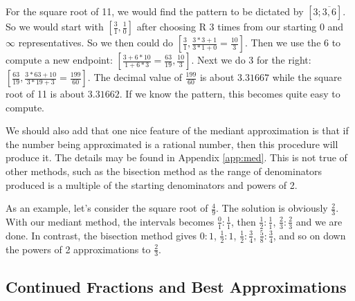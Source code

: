 \documentclass[12pt]{article}
\begin{document}
For the square root of 11, we would find the pattern to be dictated by $[3;\overline{3,6}]$. So we would start with $[\tfrac{3}{1}, \tfrac{1}{0}]$ after choosing R 3 times from our starting 0 and $\infty$ representatives. So we then could do $[\tfrac{3}{1}, \tfrac{3*3 + 1}{3*1 + 0} = \tfrac{10}{3}]$. Then we use the 6 to compute a new endpoint:  $[\tfrac{3+6*10}{1+6*3} = \tfrac{63}{19}, \tfrac{10}{3}]$. Next we do 3 for the right:  $[\tfrac{63}{19}, \tfrac{3*63+10}{3*19+3} = \tfrac{199}{60}]$. The decimal value of $\tfrac{199}{60}$ is about $3.31667$ while the square root of 11 is about $3.31662$. If we know the pattern, this becomes quite easy to compute. 

We should also add that one nice feature of the mediant approximation is that if the number being approximated is a rational number, then this procedure will produce it. The details may be found in Appendix \ref{app:med}. This is not true of other methods, such as the bisection method as the range of denominators produced is a multiple of the starting denominators and powers of 2. 

As an example, let's consider the square root of $\frac{4}{9}$. The solution is obviously $\frac{2}{3}$. With our mediant method, the intervals becomes $\frac{0}{1}:\frac{1}{1}$, then $\frac{1}{2}:\frac{1}{1}$, $\frac{2}{3}:\frac{2}{3}$ and we are done. In contrast, the bisection method gives $0:1$, $\frac{1}{2}:1$, $\frac{1}{2}:\frac{3}{4}$, $\frac{5}{8}:\frac{3}{4}$, and so on down the powers of 2 approximations to $\frac{2}{3}$. 

\subsection{Continued Fractions and Best Approximations}
\end{document}
